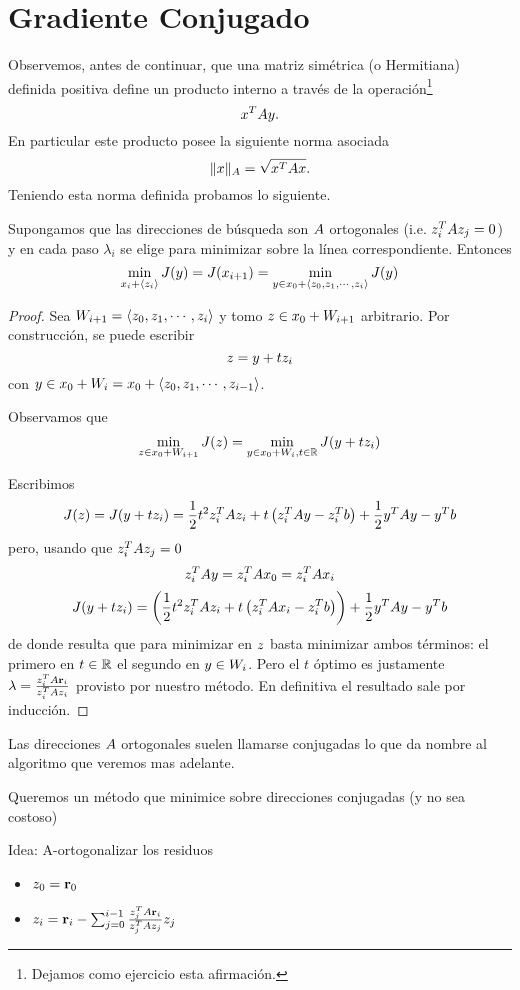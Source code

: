 \section{Gradiente Conjugado}
Observemos, antes de continuar, que una matriz simétrica (o Hermitiana) definida positiva define un producto interno a través de la operación\footnote{Dejamos como ejercicio esta afirmación.}
$$
\xb^T\Ab\yb.
$$
En particular este producto posee la siguiente norma asociada
$$
\|\xb\|_A=\sqrt{\xb^T\Ab\xb}.
$$
Teniendo esta norma definida probamos lo siguiente.
\tcc
\begin{lema}
Supongamos que las direcciones de búsqueda son $\Ab$ ortogonales (i.e. $\zb_i^T\Ab\zb_j=0$) y en cada paso $\lambda_i$ se elige para minimizar sobre la línea correspondiente. Entonces
$$
\min_{\xb_i+\langle \zb_i\rangle}J(\yb)=J(\xb_{i+1})=\min_{\yb\in \xb_0+\langle \zb_0,\zb_1,\cdots,\zb_i \rangle} J(\yb)
$$
\end{lema}
\etcc
\begin{proof}
 Sea $W_{i+1}=\langle \zb_0,\zb_1,\cdots,\zb_i \rangle$ y tomo $\zb\in \xb_0+W_{i+1}$ arbitrario. Por construcción, se puede escribir
 $$\zb=\yb+t\zb_i$$ con $\yb\in \xb_0+ W_i=\xb_0+\langle \zb_0,\zb_1,\cdots,\zb_{i-1} \rangle$.

Observamos que
  $$
 \min_{\zb\in \xb_0+W_{i+1}}J(\zb)=\min_{\yb\in\xb_0+W_{i},t \in \R} J(\yb+t \zb_i)
 $$

Escribimos
$$
J(z)=J(\yb+t\zb_i)=\frac{1}{2}t^2\zb_i^T\Ab\zb_i+t\left(\zb_i^T\Ab\yb-\zb_i^T\bb\right) +\frac{1}{2}\yb^T\Ab\yb-\yb^T\bb
$$
pero, usando que $\zb_i^T\Ab\zb_j=0$
$$
\zb_i^T\Ab\yb=\zb_i^T\Ab\xb_0=\zb_i^T\Ab\xb_i
$$
$$
J(\yb+t\zb_i)=\left(\frac{1}{2}t^2\zb_i^T\Ab\zb_i+t\left(\zb_i^T\Ab\xb_i-\zb_i^T\bb\right)\right) +\frac{1}{2}\yb^T\Ab\yb-\yb^T\bb
$$
de donde resulta que
para minimizar en $\zb$ basta minimizar ambos términos: el primero en $t\in \mathbb R$ el segundo en $\yb\in W_i$. Pero el $t$ óptimo es justamente $\lambda=\frac{\zb_i^T\Ab\rb_i}{\zb_i^T\Ab\zb_i}$ provisto por nuestro método. En definitiva
  el resultado sale por inducción.
\end{proof}

\tccdefi
\begin{center}Las direcciones $\Ab$ ortogonales suelen llamarse conjugadas lo que da nombre al algoritmo que veremos mas adelante.
\end{center}
\etcc
Queremos un método que minimice sobre direcciones conjugadas (y no sea costoso)

Idea: A-ortogonalizar los residuos
\begin{itemize}
 \item $\zb_0=\rb_0$
 \item $\zb_i=\rb_i-\sum_{j=0}^{i-1}\frac{\zb_j^T\Ab\rb_i}{\zb_j^T\Ab\zb_j}\zb_j$
\end{itemize}



